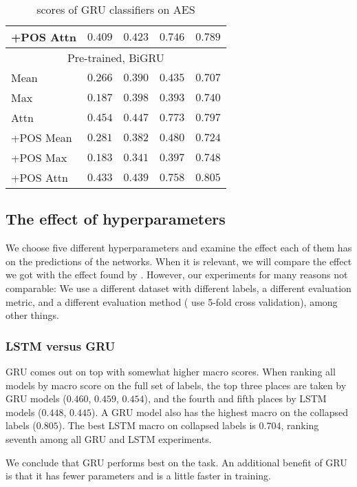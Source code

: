 \begin{table}
\begin{tabular}{lrrrr}
    +POS Attn & $0.409$ & $0.423$ & $0.746$ & $0.789$ \\
    \midrule \multicolumn{5}{c}{Pre-trained, BiGRU} \\ \midrule
    Mean & $0.266$ & $0.390$ & $0.435$ & $0.707$ \\
    Max & $0.187$ & $0.398$ & $0.393$ & $0.740$ \\
    Attn & $0.454$ & $0.447$ & $0.773$ & $0.797$ \\
    +POS Mean & $0.281$ & $0.382$ & $0.480$ & $0.724$ \\
    +POS Max & $0.183$ & $0.341$ & $0.397$ & $0.748$ \\
    +POS Attn & $0.433$ & $0.439$ & $0.758$ & $0.805$ \\
    \bottomrule
  \end{tabular}
  \caption{\FI scores of GRU classifiers on AES}
  \label{tab:gru-results}
\end{table}


\subsection{The effect of hyperparameters}

We choose five different hyperparameters and examine the effect each of them
has on the predictions of the networks. When it is relevant, we will compare
the effect we got with the effect found by \textcite{taghipour16}. However,
our experiments for many reasons not comparable: We use a different dataset
with different labels, a different evaluation metric, and a different
evaluation method (\citeauthor{taghipour16} use 5-fold cross validation),
among other things. 


\subsubsection{LSTM versus GRU}

GRU comes out on top with somewhat higher macro \FI scores. When ranking all
models by macro \FI score on the full set of labels, the top three places are
taken by GRU models ($0.460$, $0.459$, $0.454$), and the fourth and fifth
places by LSTM models ($0.448$, $0.445$). A GRU model also has the highest
macro \FI on the collapsed labels ($0.805$). The best LSTM macro \FI on
collapsed labels is $0.704$, ranking seventh among all GRU and LSTM
experiments.

We conclude that GRU performs best on the task. An additional benefit of GRU
is that it has fewer parameters and is a little faster in training.


